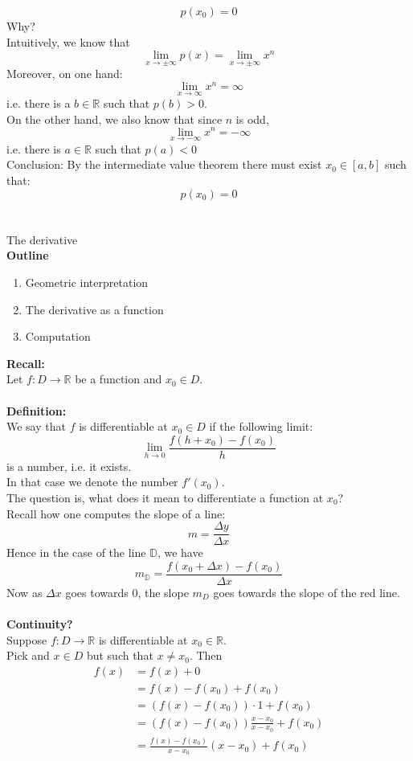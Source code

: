\documentclass[]{article}
\begin{document}
	$$
		p(x_0)=0
	$$
	Why?\\
	Intuitively, we know that
	$$
		\lim_{x\to\pm\infty}p(x)=\lim_{x\to\pm\infty}x^n
	$$
	Moreover, on one hand:
	$$
		\lim_{x\to\infty}x^n=\infty
	$$
	i.e. there is a $b\in\mathbb{R}$ such that $p(b)>0$.\\
	On the other hand, we also know that since $n$ is odd,
	$$
		\lim_{x\to-\infty}x^n=-\infty
	$$
	i.e. there is $a\in\mathbb{R}$ such that $p(a)<0$\\
	Conclusion: By the intermediate value theorem there must exist $x_0\in[a,b]$ such that:
	$$
		p(x_0)=0
	$$\\
	\pagebreak\\
	\Large{The derivative}\\
	\normalsize
	{\bf Outline}
	\begin{enumerate}
		\item Geometric interpretation
		\item The derivative as a function
		\item Computation\\
	\end{enumerate}
	{\bf Recall:}\\
	Let $f:D\rightarrow\mathbb{R}$ be a function and $x_0\in D$.\\\\
	{\bf Definition:}\\
	We say that $f$ is differentiable at $x_0\in D$ if the following limit:
	$$
		\lim_{h\to 0}\frac{f(h+x_0)-f(x_0)}{h}
	$$
	is a number, i.e. it exists.\\
	In that case we denote the number $f'(x_0)$.\\
	The question is, what does it mean to differentiate a function at $x_0$?\\
	Recall how one computes the slope of a line:
	$$
		m=\frac{\Delta y}{\Delta x}
	$$
	Hence in the case of the line $\mathbb{D}$, we have
	$$
		m_{\mathbb{D}}=\frac{f(x_0+\Delta x)-f(x_0)}{\Delta x}
	$$
	Now as $\Delta x$ goes towards 0, the slope $m_D$ goes towards the slope of the red line.\\\\
	{\bf Continuity?}\\
	Suppose $f:D\rightarrow\mathbb{R}$ is differentiable at $x_0\in\mathbb{R}$.\\
	Pick and $x\in D$ but such that $x\ne x_0$. Then
	\begin{align*}
		f(x)&=f(x)+0\\
		&=f(x)-f(x_0)+f(x_0)\\
		&=(f(x)-f(x_0))\cdot 1+f(x_0)\\
		&=(f(x)-f(x_0))\frac{x-x_0}{x-x_0}+f(x_0)\\
		&=\frac{f(x)-f(x_0)}{x-x_0}(x-x_0)+f(x_0)
	\end{align*}
\end{document}
